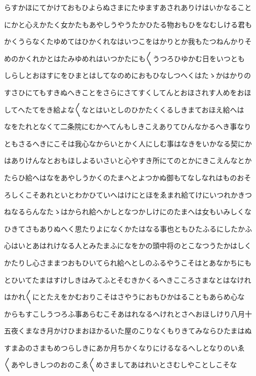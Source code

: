 \documentclass[a4paper,11pt,landscape]{ltjtarticle}
\begin{document}
らすかほにてかけておもひよらぬさまにたゆますあされありけはいかなること
\par\medskip
にかと心えかたく女かたもあやしうやうたかひたる物おもひをなむしける君も
\par\medskip
かくうらなくたゆめてはひかくれなはいつこをはかりとか我もたつねんかりそ
\par\medskip
めのかくれかとはたみゆめれはいつかたにも〱うつろひゆかむ日をいつとも
\par\medskip
しらしとおほすにをひまとはしてなのめにおもひなしつへくはたゝかはかりの
\par\medskip
すさひにてもすきぬへきことをさらにさてすくしてんとおほされす人めをおほ
\par\medskip
してへたてをき給よな〱なとはいとしのひかたくくるしきまておほえ給へは
\par\medskip
なをたれとなくて二条院にむかへてんもしきこえありてひんなかるへき事なり
\par\medskip
ともさるへきにこそは我心なからいとかく人にしむ事はなきをいかなる契にか
\par\medskip
はありけんなとおもほしよるいさいと心やすき所にてのとかにきこえんなとか
\par\medskip
たらひ給へはなをあやしうかくのたまへとよつかぬ御もてなしなれはものおそ
\par\medskip
ろしくこそあれといとわかひていへはけにとほをゑまれ給てけにいつれかきつ
\par\medskip
ねなるらんなたゝはかられ給へかしとなつかしけにのたまへは女もいみしくな
\par\medskip
ひきてさもありぬへく思たりよになくかたはなる事也ともひたふるにしたかふ
\par\medskip
心はいとあはれけなる人とみたまふになをかの頭中将のとこなつうたかはしく
\par\medskip
かたりし心さままつおもひいてられ給へとしのふるやうこそはとあなかちにも
\par\medskip
とひいてたまはすけしきはみてふとそむきかくるへきこころさまなとはなけれ
\par\medskip
はかれ〱にとたえをかむおりこそはさやうにおもひかはることもあらめ心な
\par\medskip
からもすこしうつろふ事あらむこそあはれなるへけれとさへおほしけり八月十
\par\medskip
五夜くまなき月かけひまおほかるいた屋のこりなくもりきてみならひたまはぬ
\par\medskip
すまゐのさまもめつらしきにあか月ちかくなりにけるなるへしとなりのいゑ
\par\medskip
〱あやしきしつのおのこゑ〱めさましてあはれいとさむしやことしこそな
\end{document}
